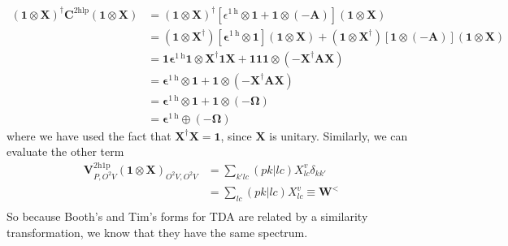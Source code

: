 \begin{align}
    \left( \bm{1} \otimes \bm{X } \right)^\dagger \bm{C}^{2 \mathrm{hlp}} \left( \bm{1} \otimes \bm{X } \right) &= \left( \bm{1} \otimes \bm{X } \right)^\dagger \left[\epsilon^{1 \mathrm{~h}} \otimes \bm{1} + \bm{1} \otimes (-\bm{A})\right] \left( \bm{1} \otimes \bm{X } \right) \\
&= \left( \bm{1} \otimes \bm{X }^\dagger \right) \left[\bm{\epsilon}^{1 \mathrm{~h}} \otimes \bm{1}\right] \left( \bm{1} \otimes \bm{X } \right) + \left( \bm{1} \otimes \bm{X }^\dagger \right) \left[\bm{1} \otimes (-\bm{A})\right] \left( \bm{1} \otimes \bm{X } \right)\\
&= \bm{1}\bm{\epsilon}^{1 \mathrm{~h}}\bm{1} \otimes \bm{X }^\dagger \bm{1} \bm{X } + \bm{1} \bm{1} \bm{1} \otimes (-\bm{X }^\dagger \bm{A} \bm{X }) \\
&= \bm{\epsilon}^{1 \mathrm{~h}} \otimes \bm{1} + \bm{1} \otimes (-\bm{X }^\dagger \bm{A} \bm{X }) \\
&= \bm{\epsilon}^{1 \mathrm{~h}} \otimes \bm{1} + \bm{1} \otimes (-\bm{\Omega }) \\
&= \bm{\epsilon}^{1 \mathrm{~h}} \oplus (-\bm{\Omega }) 
\end{align}
where we have used the fact that $\bm{X}^\dag \bm{X} = \bm{1}$, since $\bm{X}$ is unitary. Similarly, we can evaluate the other term
\begin{align}
    \bm{V}^{2 \mathrm{h1p}}_{P,O^2V}\left( \bm{1}\otimes \bm{X }\right)_{O^2V,O^2V} &= \sum_{k'lc} (pk|lc) X_{lc}^{v} \delta_{kk'}\\
&= \sum_{lc} (pk|lc) X_{lc}^{v}
 \equiv \bm{W}^< \\
\end{align}
So because Booth's and Tim's forms for TDA are related by a similarity transformation, we know that they have the same spectrum.
